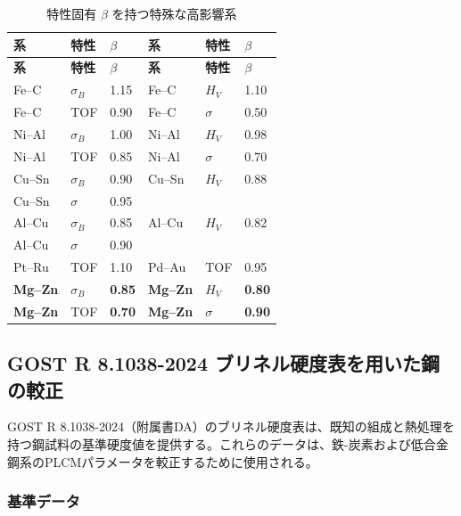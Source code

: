 \documentclass[12pt,a4paper]{article}
\begin{document}
	\begin{longtable}{p{2.2cm} p{2.2cm} p{1.2cm} p{2.2cm} p{2.2cm} p{1.2cm}}
		\caption{特性固有 $\beta$ を持つ特殊な高影響系}\label{tab:beta_special}\\
		\toprule
		\textbf{系} & \textbf{特性} & $\beta$ & \textbf{系} & \textbf{特性} & $\beta$ \\
		\midrule
		\endfirsthead
		\toprule
		\textbf{系} & \textbf{特性} & $\beta$ & \textbf{系} & \textbf{特性} & $\beta$ \\
		\midrule
		\endhead
		Fe–C  & $\sigma_B$ & 1.15 & Fe–C  & $H_V$ & 1.10 \\
		Fe–C  & TOF & 0.90 & Fe–C  & $\sigma$ & 0.50 \\
		Ni–Al & $\sigma_B$ & 1.00 & Ni–Al & $H_V$ & 0.98 \\
		Ni–Al & TOF & 0.85 & Ni–Al & $\sigma$ & 0.70 \\
		Cu–Sn & $\sigma_B$ & 0.90 & Cu–Sn & $H_V$ & 0.88 \\
		Cu–Sn & $\sigma$ & 0.95 & & & \\
		Al–Cu & $\sigma_B$ & 0.85 & Al–Cu & $H_V$ & 0.82 \\
		Al–Cu & $\sigma$ & 0.90 & & & \\
		Pt–Ru & TOF & 1.10 & Pd–Au & TOF & 0.95 \\
		\rowcolor{gray!10}
		\textbf{Mg–Zn} & $\sigma_B$ & \textbf{0.85} & \textbf{Mg–Zn} & $H_V$ & \textbf{0.80} \\
		\textbf{Mg–Zn} & TOF & \textbf{0.70} & \textbf{Mg–Zn} & $\sigma$ & \textbf{0.90} \\
		\bottomrule
	\end{longtable}
	
	
	\subsection{GOST R 8.1038-2024 ブリネル硬度表を用いた鋼の較正}
	\label{subsec:steel_calibration}
	
	GOST R 8.1038-2024（附属書DA）のブリネル硬度表は、既知の組成と熱処理を持つ鋼試料の基準硬度値を提供する。これらのデータは、鉄-炭素および低合金鋼系のPLCMパラメータを較正するために使用される。
	
	\subsubsection{基準データ}
	
\end{document}
